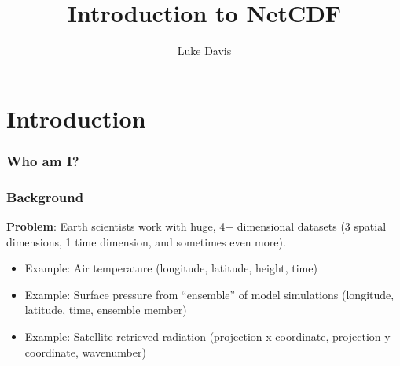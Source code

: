 \documentclass[aspectratio=169]{beamer}
\begin{document}
\title{Introduction to NetCDF}
\author[Davis, Luke]{Luke Davis}
\date{}
\frame{\titlepage}

\section{Introduction}
\begin{frame}

  \frametitle{Who am I?}

\end{frame}


\begin{frame}

  \frametitle{Background}

  \textbf{Problem}:
  Earth scientists
  work with
  huge,
  4+ dimensional datasets
  (3 spatial dimensions, 1 time dimension, and sometimes even more).
  \begin{itemize}
    \item
      Example: Air temperature (longitude, latitude, height, time)
    \item
      Example: Surface pressure from ``ensemble'' of model simulations
      (longitude, latitude, time, ensemble member)
    \item
      Example: Satellite-retrieved radiation
      (projection x-coordinate, projection y-coordinate, wavenumber)
  \end{itemize}

\end{frame}
\end{document}
